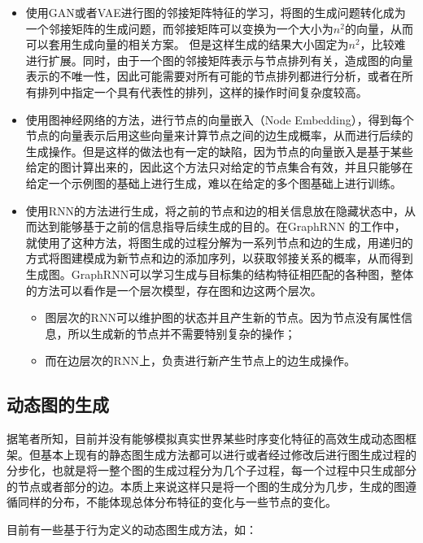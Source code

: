 \begin{itemize}
  \item 使用GAN或者VAE进行图的邻接矩阵特征的学习，将图的生成问题转化成为一个邻接矩阵的生成问题，而邻接矩阵可以变换为一个大小为$n^2$的向量，从而可以套用生成向量的相关方案。
  但是这样生成的结果大小固定为$n^2$，比较难进行扩展。同时，由于一个图的邻接矩阵表示与节点排列有关，造成图的向量表示的不唯一性，因此可能需要对所有可能的节点排列都进行分析，或者在所有排列中指定一个具有代表性的排列，这样的操作时间复杂度较高。
  \item 使用图神经网络的方法，进行节点的向量嵌入（Node Embedding），得到每个节点的向量表示后用这些向量来计算节点之间的边生成概率，从而进行后续的生成操作。但是这样的做法也有一定的缺陷，因为节点的向量嵌入是基于某些给定的图计算出来的，因此这个方法只对给定的节点集合有效，并且只能够在给定一个示例图的基础上进行生成，难以在给定的多个图基础上进行训练。
  \item 使用RNN的方法进行生成，将之前的节点和边的相关信息放在隐藏状态中，从而达到能够基于之前的信息指导后续生成的目的。在GraphRNN \cite{You2018GraphRNN} 的工作中，就使用了这种方法，将图生成的过程分解为一系列节点和边的生成，用递归的方式将图建模成为新节点和边的添加序列，以获取邻接关系的概率，从而得到生成图。GraphRNN可以学习生成与目标集的结构特征相匹配的各种图，整体的方法可以看作是一个层次模型，存在图和边这两个层次。
  \begin{itemize}
    \item 图层次的RNN可以维护图的状态并且产生新的节点。因为节点没有属性信息，所以生成新的节点并不需要特别复杂的操作；
    \item 而在边层次的RNN上，负责进行新产生节点上的边生成操作。
  \end{itemize}
\end{itemize}

\vspace{0.2cm}

\subsection{动态图的生成}

据笔者所知，目前并没有能够模拟真实世界某些时序变化特征的高效生成动态图框架。但基本上现有的静态图生成方法都可以进行或者经过修改后进行图生成过程的分步化，也就是将一整个图的生成过程分为几个子过程，每一个过程中只生成部分的节点或者部分的边。本质上来说这样只是将一个图的生成分为几步，生成的图遵循同样的分布，不能体现总体分布特征的变化与一些节点的变化。

目前有一些基于行为定义的动态图生成方法，如：

